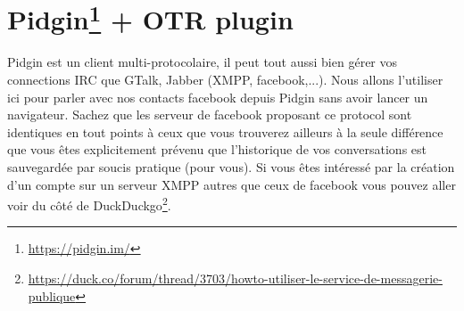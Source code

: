 \documentclass[a4paper]{article}
\begin{document}
\section{Pidgin\protect\footnote{\url{https://pidgin.im/}} + OTR plugin}
Pidgin est un client multi-protocolaire, il peut tout aussi bien gérer vos connections
IRC que GTalk, Jabber (XMPP, facebook,...).
Nous allons l'utiliser ici pour parler avec nos contacts facebook depuis Pidgin
sans avoir lancer un navigateur. Sachez que les serveur de facebook proposant ce
protocol sont identiques en tout points à ceux que vous trouverez ailleurs à la seule
différence que vous êtes explicitement prévenu que l'historique de vos conversations
est sauvegardée par soucis pratique (pour vous).
Si vous êtes intéressé par la création d'un compte sur un serveur XMPP autres que
ceux de facebook vous pouvez aller voir du côté de
DuckDuckgo\protect\footnote{\url{https://duck.co/forum/thread/3703/howto-utiliser-le-service-de-messagerie-publique}}.
\end{document}
